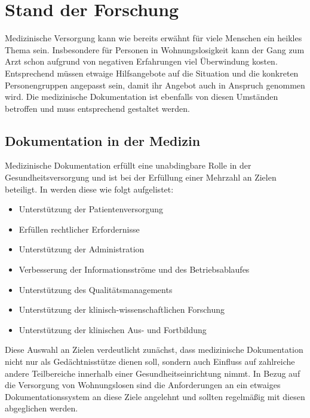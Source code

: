 \chapter{Stand der Forschung}\label{ch:relatedWork}

Medizinische Versorgung kann wie bereits erwähnt für viele Menschen ein heikles Thema sein. Insbesondere für Personen in Wohnungslosigkeit kann der Gang zum Arzt schon aufgrund von negativen Erfahrungen viel Überwindung kosten. Entsprechend müssen etwaige Hilfsangebote auf die Situation und die konkreten Personengruppen angepasst sein, damit ihr Angebot auch in Anspruch genommen wird. Die medizinische Dokumentation ist ebenfalls von diesen Umständen betroffen und muss entsprechend gestaltet werden.

\section{Dokumentation in der Medizin}

Medizinische Dokumentation erfüllt eine unabdingbare Rolle in der Gesundheitsversorgung und ist bei der Erfüllung einer Mehrzahl an Zielen beteiligt. In \citet{Leiner.2012} werden diese wie folgt aufgelistet:

\begin{itemize}
	\item Unterstützung der Patientenversorgung
	\item Erfüllen rechtlicher Erfordernisse
	\item Unterstützung der Administration
	\item Verbesserung der Informationsströme und des Betriebsablaufes
	\item Unterstützung des Qualitätsmanagements
	\item Unterstützung der klinisch-wissenschaftlichen Forschung
	\item Unterstützung der klinischen Aus- und Fortbildung
\end{itemize}

Diese Auswahl an Zielen verdeutlicht zunächst, dass medizinische Dokumentation nicht nur als Gedächtnisstütze dienen soll, sondern auch Einfluss auf zahlreiche andere Teilbereiche innerhalb einer Gesundheitseinrichtung nimmt. In Bezug auf die Versorgung von Wohnungslosen sind die Anforderungen an ein etwaiges Dokumentationssystem an diese Ziele angelehnt und sollten regelmäßig mit diesen abgeglichen werden.

